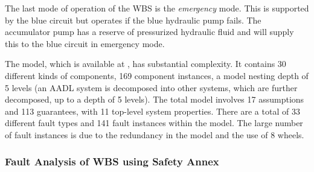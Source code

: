 The last mode of operation of the WBS is the \textit{emergency} mode. This is supported by the blue circuit but operates if the blue hydraulic pump fails. The accumulator pump has a reserve of pressurized hydraulic fluid and will supply this to the blue circuit in emergency mode.

The model, which is available at , has substantial complexity. It contains 30 different kinds of components, 169 component instances, a model nesting depth of 5 levels (an AADL system is decomposed into other systems, which are further decomposed, up to a depth of 5 levels).  The total model involves 17 assumptions and 113 guarantees, with 11 top-level system properties.  There are a total of 33 different fault types and 141 fault instances within the model.  The large number of fault instances is due to the redundancy in the model and the use of 8 wheels.




\subsubsection{Fault Analysis of WBS using Safety Annex}

\iffalse

